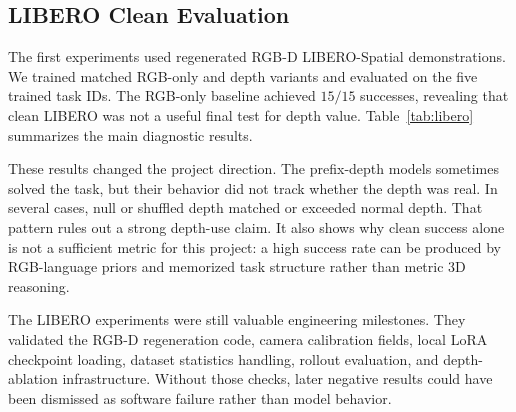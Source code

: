 \documentclass[conference]{IEEEtran}
\begin{document}
\subsection{LIBERO Clean Evaluation}

The first experiments used regenerated RGB-D LIBERO-Spatial demonstrations. We trained matched RGB-only and depth variants and evaluated on the five trained task IDs. The RGB-only baseline achieved $15/15$ successes, revealing that clean LIBERO was not a useful final test for depth value. Table~\ref{tab:libero} summarizes the main diagnostic results.

\begin{table}[t]
\centering
\caption{LIBERO-Spatial clean evaluation on five trained tasks, three trials per task.}
\label{tab:libero}
\end{table}

These results changed the project direction. The prefix-depth models sometimes solved the task, but their behavior did not track whether the depth was real. In several cases, null or shuffled depth matched or exceeded normal depth. That pattern rules out a strong depth-use claim. It also shows why clean success alone is not a sufficient metric for this project: a high success rate can be produced by RGB-language priors and memorized task structure rather than metric 3D reasoning.

The LIBERO experiments were still valuable engineering milestones. They validated the RGB-D regeneration code, camera calibration fields, local LoRA checkpoint loading, dataset statistics handling, rollout evaluation, and depth-ablation infrastructure. Without those checks, later negative results could have been dismissed as software failure rather than model behavior.
\end{document}
